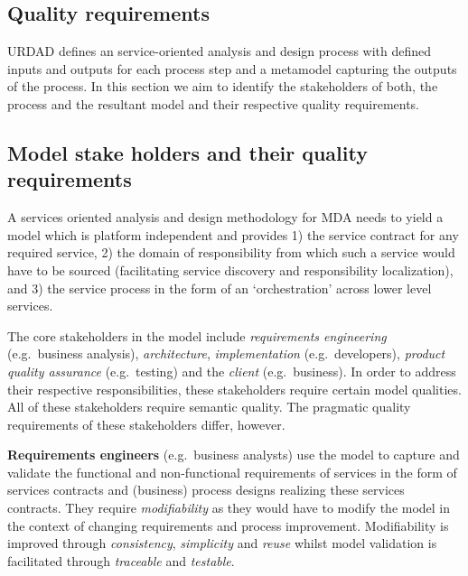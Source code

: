 \subsection{Quality requirements}


URDAD defines an service-oriented analysis and design process with defined inputs and outputs for each process step and a metamodel capturing the outputs of the process. In this section we aim to identify the stakeholders of both, the process and the resultant model and their respective quality requirements.

\subsection{Model stake holders and their quality requirements}

A services oriented analysis and design methodology for MDA needs to yield a model which is platform independent and provides 1) the service contract for any required service, 2) the domain of responsibility from which such a service would have to be sourced (facilitating service discovery and responsibility localization), and 3) the service process in the form of an `orchestration' across lower level services\cite{}.

The core stakeholders in the model include \emph{requirements engineering} (e.g.\ business analysis), \emph{architecture}, \emph{implementation} (e.g.\ developers), \emph{product quality assurance} (e.g.\ testing) and the \emph{client} (e.g.\ business). In order to address their respective responsibilities, these stakeholders require certain model qualities. All of these stakeholders require semantic quality. The pragmatic quality requirements of these stakeholders differ, however.

{\bf Requirements engineers} (e.g.\ business analysts) use the model to capture and validate the functional and non-functional requirements of  services in the form of services contracts and (business) process designs realizing these services contracts. They require \emph{modifiability} as they would have to modify the model in the context of changing requirements and process improvement. Modifiability is improved through \emph{consistency}, \emph{simplicity} and \emph{reuse} whilst model validation is facilitated through \emph{traceable} and \emph{testable}. 

